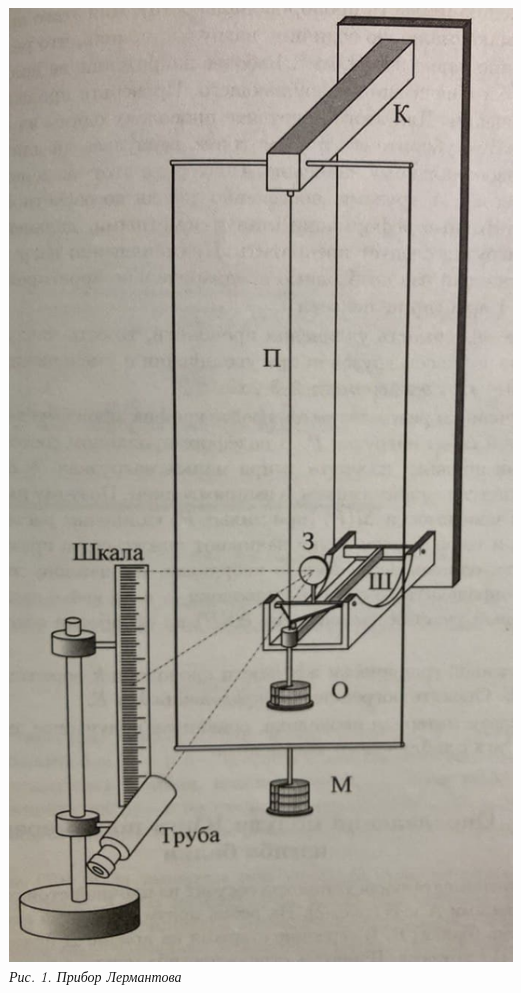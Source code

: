 \documentclass[12pt, a4paper]{article}
\begin{document}
\begin{minipage}[c]{0.42\textwidth}
    \begin{center}
        \includegraphics[scale=0.3]{Pics/Picture1.jpg} \\
        \textit{\textcolor[HTML]{000000}{Рис. 1. Прибор Лермантова}}
    \end{center}
\end{minipage}  
\end{document}
